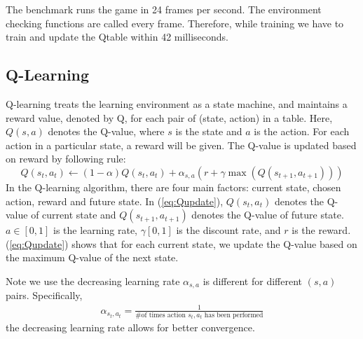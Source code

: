 The benchmark runs the game in 24 frames per second. The environment checking functions are called every frame. Therefore, while training we have to train and update the Qtable within 42 milliseconds.

\subsection{Q-Learning}
Q-learning treats the learning environment as a state machine, and maintains a reward value, denoted by Q, for each pair of (state, action) in a table. Here, $Q(s,a)$ denotes the Q-value, where $s$ is the state and $a$ is the action. For each action in a particular state, a reward will be given. The Q-value is updated based on reward by following rule:
\begin{equation}
\label{eq:Qupdate}
Q(s_t,a_t) \leftarrow (1-\alpha)Q(s_t,a_t) + \alpha_{s, a}(r+\gamma\max(Q(s_{t+1},a_{t+1})))
\end{equation}
In the Q-learning algorithm, there are four main factors: current state, chosen action, reward and future state. In (\ref{eq:Qupdate}), $Q(s_t,a_t)$ denotes the Q-value of current state and $Q(s_{t+1},a_{t+1})$ denotes the Q-value of future state. $a \in \left[0,1\right]$ is the learning rate, $\gamma \left[0,1\right]$ is the discount rate, and $r$ is the reward. (\ref{eq:Qupdate}) shows that for each current state, we update the Q-value based on the maximum Q-value of the next state.

Note we use the decreasing learning rate $\alpha_{s, a}$ \cite{??} is different for different $(s,a)$ pairs. Specifically, 
\begin{align*}
\alpha_{s_t, a_t} = \frac{1}{\text{\# of times action $s_t, a_t$ has been performed}}
\end{align*}
the decreasing learning rate allows for better convergence.


